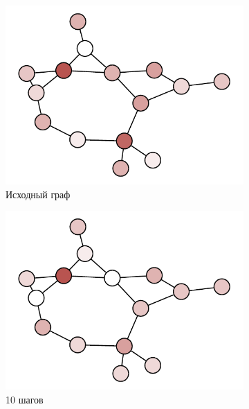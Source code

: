 \begin{figure}[t]
    \centering
    \begin{subfigure}[b]{0.24\textwidth}
    \includegraphics[width=\textwidth]{images/graph_diffusion_0}
    \caption{Исходный граф}
    \end{subfigure}
    \begin{subfigure}[b]{0.24\textwidth}
    \includegraphics[width=\textwidth]{images/graph_diffusion_10}
    \caption{10 шагов}
    \end{subfigure}
    \begin{subfigure}[b]{0.24\textwidth}

\end{subfigure}
\end{figure}
